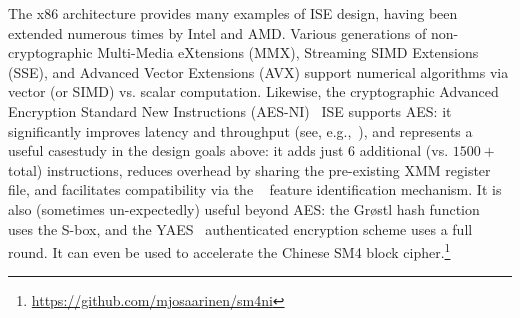 \noindent
The x86 architecture provides many examples of ISE design,
having been extended numerous times by Intel and AMD.
Various generations of
non-cryptographic
Multi-Media      eXtensions (MMX),
Streaming SIMD  Extensions (SSE),
and
Advanced Vector Extensions (AVX)
support numerical algorithms via vector (or SIMD) vs. scalar computation.  
Likewise, the
    cryptographic
Advanced Encryption Standard New Instructions (AES-NI)~\cite{Gueron:09,DruGueKra:19}
ISE
supports AES: it significantly improves latency and throughput
(see, e.g.,~\cite{FazLopOli:18}),
and represents a useful casestudy in the design goals above:
it adds just $6$ additional (vs. $1500+$ total) instructions,
reduces overhead by sharing the pre-existing XMM register file,
and facilitates compatibility via the
~\cite[Chapter 20]{X86:1:18}
feature identification mechanism.
It is also (sometimes un-expectedly) useful beyond AES:
the Gr{\o}stl hash function ~\cite{GKMMRST:11} uses the S-box,
and
the YAES~\cite{BosVer:14} authenticated encryption scheme uses a full round.
It can even be used to accelerate the Chinese SM4 block cipher.\footnote{\url{https://github.com/mjosaarinen/sm4ni}}


